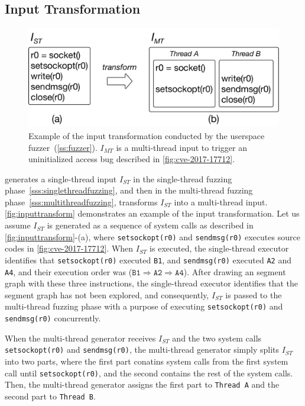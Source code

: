 \subsection{Input Transformation}
\label{s:appendix:inputtransform}


\begin{figure}[h]
  \centering
  \includegraphics[width=0.8\linewidth]{fig/inputtransform.pdf}
  \caption{Example of the input transformation conducted by the
    userspace fuzzer~(\autoref{ss:fuzzer}). $I_{MT}$ is a multi-thread
    input to trigger an uninitialized access bug described in
    \autoref{fig:cve-2017-17712}.}
  \label{fig:inputtransform}
\end{figure}

\sys generates a single-thread input $I_{ST}$ in the single-thread
fuzzing phase~\autoref{sss:singlethreadfuzzing}, and then in the
multi-thread fuzzing phase~\autoref{sss:multithreadfuzzing},
transforms $I_{ST}$ into a multi-thread input.
%
\autoref{fig:inputtransform} demonstrates an example of the input
transformation. Let us assume $I_{ST}$ is generated as a sequence of
system calls as described in \autoref{fig:inputtransform}-(a), where
\texttt{setsockopt(r0)} and \texttt{sendmsg(r0)} executes source codes
in \autoref{fig:cve-2017-17712}. When $I_{ST}$ is executed, the
single-thread executor identifies that \texttt{setsockopt(r0)}
executed \texttt{B1}, and \texttt{sendmsg(r0)} executed \texttt{A2}
and \texttt{A4}, and their execution order was
($\texttt{B1} \Rightarrow \texttt{A2} \Rightarrow \texttt{A4}$).
%
After drawing an segment graph with these three instructions, the
single-thread executor identifies that the segment graph has not been
explored, and consequently, $I_{ST}$ is passed to the multi-thread
fuzzing phase with a purpose of executing \texttt{setsockopt(r0)} and
\texttt{sendmsg(r0)} concurrently.


When the multi-thread generator receives $I_{ST}$ and the two system
calls \texttt{setsockopt(r0)} and \texttt{sendmsg(r0)}, the
multi-thread generator simply splits $I_{ST}$ into two parts, where
the first part conatins system calls from the first system call until
\texttt{setsockopt(r0)}, and the second contains the rest of the
system calls. Then, the multi-thread generator assigns the first part
to \texttt{Thread~A} and the second part to \texttt{Thread~B}.


